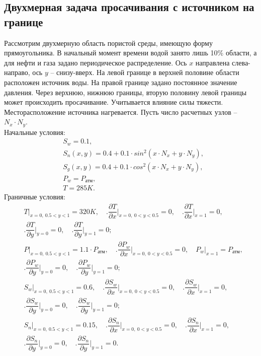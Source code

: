 
\subsection{Двухмерная задача просачивания с источником на границе}
Рассмотрим двухмерную область пористой среды, имеющую форму
прямоугольника. В начальный момент времени водой занято лишь
10\% области, а для нефти и газа задано периодическое распределение. Ось $x$ направлена слева-направо,
ось $y$ -- снизу-вверх. На левой границе в верхней половине области расположен источник воды.
На правой границе задано постоянное значение давления. Через верхнюю, нижнюю границы, вторую половину левой границы
может происходить просачивание. Учитывается влияние силы тяжести. Месторасположение источника нагревается. 
Пусть число расчетных узлов -- $N_x\cdot N_y$.\\
Начальные условия:
\begin{equation}
  \begin{aligned}
    &S_w=0.1,\\
    &S_n(x, y)=0.4 + 0.1 \cdot sin^2(x \cdot N_x + y \cdot N_y),\\
    &S_g(x, y)=0.4 + 0.1 \cdot cos^2(x \cdot N_x + y \cdot N_y),\\
    &P_w=P_\text{атм},\\
    &T=285K.
   \end{aligned}
\end{equation}
Граничные условия:
\begin{equation}
  \begin{aligned}
    &\left.T\right|_{x=0,\ 0.5 < y < 1}=320K,\quad \Biggl.\dfrac{\partial{T}}{\partial{x}}\Biggr|_{x=0,\ 0 < y < 0.5}=0,\quad \Biggl.\dfrac{\partial{T}}{\partial{x}}\Biggr|_{x=1}=0,\\
    &\Biggl.\dfrac{\partial{T}}{\partial{y}}\Biggr|_{y=0}=0,\quad \Biggl.\dfrac{\partial{T}}{\partial{y}}\Biggr|_{y=1}=0;\\
    &\left.P\right|_{x=0,\ 0.5 < y < 1}=1.1\cdot P_{\text{атм}},\quad \Biggl.\dfrac{\partial{P_w}}{\partial{x}}\Biggr|_{x=0,\ 0 < y < 0.5}=0,\quad \left.{P_w}\right|_{x=1}=P_{\text{атм}},\\
    &\Biggl.\dfrac{\partial{P_w}}{\partial{y}}\Biggr|_{y=0}=0,\quad \Biggl.\dfrac{\partial{P_w}}{\partial{y}}\Biggr|_{y=1}=0;\\
    &\left.S_w\right|_{x=0,\ 0.5 < y < 1}=0.6,\quad \Biggl.\dfrac{\partial{S_w}}{\partial{x}}\Biggr|_{x=0,\ 0 < y < 0.5}=0,\quad \Biggl.\dfrac{\partial{S_w}}{\partial{x}}\Biggr|_{x=1}=0,\\
    &\Biggl.\dfrac{\partial{S_w}}{\partial{y}}\Biggr|_{y=0}=0,\quad \Biggl.\dfrac{\partial{S_w}}{\partial{y}}\Biggr|_{y=1}=0;\\
    &\left.S_n\right|_{x=0,\ 0.5 < y < 1}=0.15,\quad \Biggl.\dfrac{\partial{S_n}}{\partial{x}}\Biggr|_{x=0,\ 0 < y < 0.5}=0,\quad \Biggl.\dfrac{\partial{S_n}}{\partial{x}}\Biggr|_{x=1}=0,\\
    &\Biggl.\dfrac{\partial{S_n}}{\partial{y}}\Biggr|_{y=0}=0,\quad \Biggl.\dfrac{\partial{S_n}}{\partial{y}}\Biggr|_{y=1}=0.
  \end{aligned}
\end{equation}

